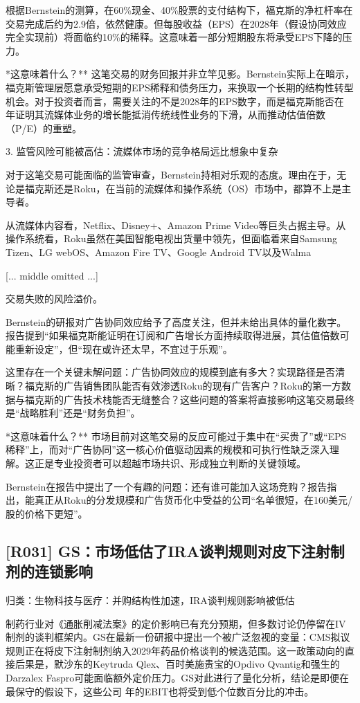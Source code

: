 \documentclass[11pt]{ctexart}
\begin{document}
根据Bernstein的测算，在60\%现金、40\%股票的支付结构下，福克斯的净杠杆率在交易完成后约为2.9倍，依然健康。但每股收益（EPS）在2028年（假设协同效应完全实现前）将面临约10\%的稀释。这意味着一部分短期股东将承受EPS下降的压力。

*这意味着什么？** 这笔交易的财务回报并非立竿见影。Bernstein实际上在暗示，福克斯管理层愿意承受短期的EPS稀释和债务压力，来换取一个长期的结构性转型机会。对于投资者而言，需要关注的不是2028年的EPS数字，而是福克斯能否在 年证明其流媒体业务的增长能抵消传统线性业务的下滑，从而推动估值倍数（P/E）的重塑。

3. 监管风险可能被高估：流媒体市场的竞争格局远比想象中复杂

对于这笔交易可能面临的监管审查，Bernstein持相对乐观的态度。理由在于，无论是福克斯还是Roku，在当前的流媒体和操作系统（OS）市场中，都算不上是主导者。

从流媒体内容看，Netflix、Disney+、Amazon Prime Video等巨头占据主导。从操作系统看，Roku虽然在美国智能电视出货量中领先，但面临着来自Samsung Tizen、LG webOS、Amazon Fire TV、Google Android TV以及Walma

[... middle omitted ...]

交易失败的风险溢价。

Bernstein的研报对广告协同效应给予了高度关注，但并未给出具体的量化数字。报告提到“如果福克斯能证明在订阅和广告增长方面持续取得进展，其估值倍数可能重新设定”，但“现在或许还太早，不宜过于乐观”。

这里存在一个关键未解问题：广告协同效应的规模到底有多大？实现路径是否清晰？福克斯的广告销售团队能否有效渗透Roku的现有广告客户？Roku的第一方数据与福克斯的广告技术栈能否无缝整合？这些问题的答案将直接影响这笔交易最终是“战略胜利”还是“财务负担”。

*这意味着什么？** 市场目前对这笔交易的反应可能过于集中在“买贵了”或“EPS稀释”上，而对“广告协同”这一核心价值驱动因素的规模和可执行性缺乏深入理解。这正是专业投资者可以超越市场共识、形成独立判断的关键领域。

Bernstein在报告中提出了一个有趣的问题：还有谁可能加入这场竞购？报告指出，能真正从Roku的分发规模和广告货币化中受益的公司“名单很短，在160美元/股的价格下更短”。

\subsection{[R031] GS：市场低估了IRA谈判规则对皮下注射制剂的连锁影响}
{\small\color{refgray}归类：生物科技与医疗：并购结构性加速，IRA谈判规则影响被低估}

制药行业对《通胀削减法案》的定价影响已有充分预期，但多数讨论仍停留在IV制剂的谈判框架内。GS在最新一份研报中提出一个被广泛忽视的变量：CMS拟议规则正在将皮下注射制剂纳入2029年药品价格谈判的候选范围。这一政策动向的直接后果是，默沙东的Keytruda Qlex、百时美施贵宝的Opdivo Qvantig和强生的Darzalex Faspro可能面临额外定价压力。GS对此进行了量化分析，结论是即便在最保守的假设下，这些公司 年的EBIT也将受到低个位数百分比的冲击。
\end{document}
